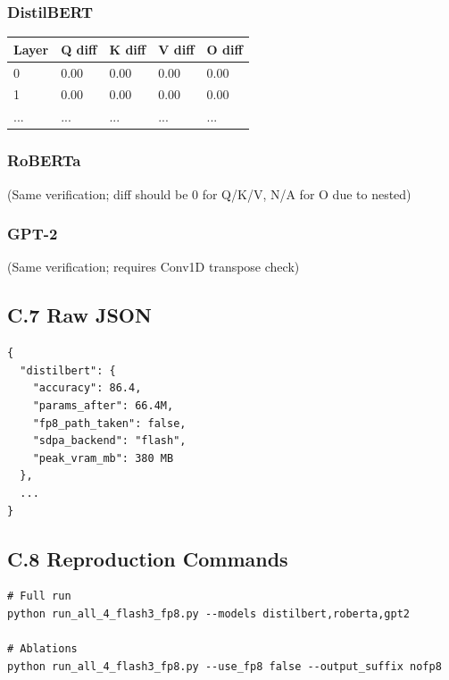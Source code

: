 \subsubsection{DistilBERT}

\begin{table}[H]
\centering
\small
\begin{tabular}{lllll}
\toprule
\textbf{Layer} & \textbf{Q diff} & \textbf{K diff} & \textbf{V diff} & \textbf{O diff} \\
\midrule
0 & 0.00 & 0.00 & 0.00 & 0.00 \\
1 & 0.00 & 0.00 & 0.00 & 0.00 \\
... & ... & ... & ... & ... \\
\bottomrule
\end{tabular}
\end{table}

\subsubsection{RoBERTa}

(Same verification; diff should be 0 for Q/K/V, N/A for O due to nested)

\subsubsection{GPT-2}

(Same verification; requires Conv1D transpose check)

\subsection{C.7 Raw JSON}

\begin{lstlisting}
{
  "distilbert": {
    "accuracy": 86.4,
    "params_after": 66.4M,
    "fp8_path_taken": false,
    "sdpa_backend": "flash",
    "peak_vram_mb": 380 MB
  },
  ...
}
\end{lstlisting}

\subsection{C.8 Reproduction Commands}

\begin{lstlisting}
# Full run
python run_all_4_flash3_fp8.py --models distilbert,roberta,gpt2

# Ablations
python run_all_4_flash3_fp8.py --use_fp8 false --output_suffix nofp8
\end{lstlisting}

